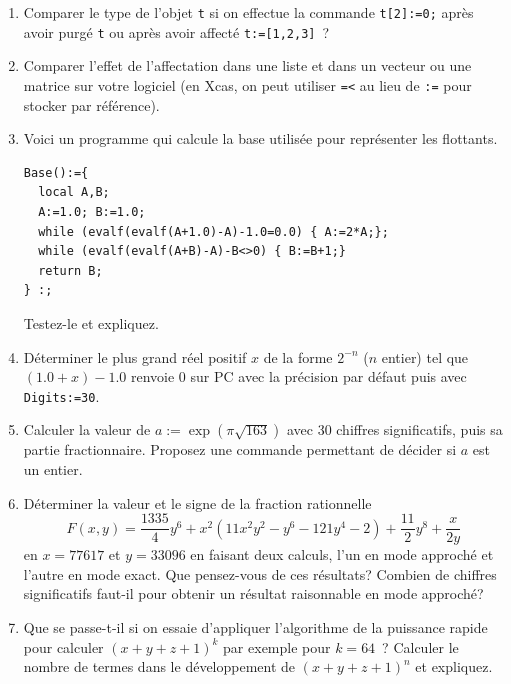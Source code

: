 \documentclass[a4paper,11pt]{article}
\begin{document}
\begin{enumerate}
\item Comparer le type de l'objet \verb|t| si on effectue
la commande \verb|t[2]:=0;| apr\`es avoir purg\'e \verb|t|
ou apr\`es avoir affect\'e \verb|t:=[1,2,3]|~?

\item Comparer l'effet de l'affectation dans une liste et dans un
  vecteur ou une matrice sur votre logiciel (en Xcas, on peut utiliser
\verb|=<| au lieu de \verb|:=| pour stocker par r\'ef\'erence).

\item Voici un programme qui calcule la base utilis\'ee
pour repr\'esenter les flottants. 
\begin{verbatim}
Base():={
  local A,B;
  A:=1.0; B:=1.0;
  while (evalf(evalf(A+1.0)-A)-1.0=0.0) { A:=2*A;};
  while (evalf(evalf(A+B)-A)-B<>0) { B:=B+1;}
  return B;
} :;
\end{verbatim}
Testez-le et expliquez.

\item D\'eterminer le plus grand r\'eel positif $x$ de la forme 
$2^{-n}$ ($n$ entier)
tel que $(1.0+x)-1.0$ renvoie 0 sur PC avec la pr\'ecision par
d\'efaut puis avec \verb|Digits:=30|.

\item Calculer la valeur de $a:=\exp(\pi \sqrt{163})$ avec 30 chiffres
significatifs, puis sa partie fractionnaire. Proposez une commande
permettant de d\'ecider si $a$ est un entier.

\item 
D\'eterminer la valeur et le signe de la fraction rationnelle 
\[ F(x,y)= \frac{1335}{4} y^6 + x^2 (11x^2 y^2-y^6 -121y^4-2) + 
\frac{11}{2} y^8 + \frac{x}{2y}\]
en $x=77617$ et $y=33096$ en faisant deux calculs, l'un en mode approch\'e et 
l'autre en mode exact. Que pensez-vous de ces r\'esultats?
Combien de chiffres significatifs faut-il pour obtenir un r\'esultat
raisonnable en mode approch\'e?

\item Que se passe-t-il si on essaie d'appliquer l'algorithme de la
puissance rapide pour calculer $(x+y+z+1)^{k}$ par exemple pour
$k=64$~? 
Calculer le nombre
de termes dans le d\'eveloppement de $(x+y+z+1)^n$ et expliquez.


\end{enumerate}
\end{document}
